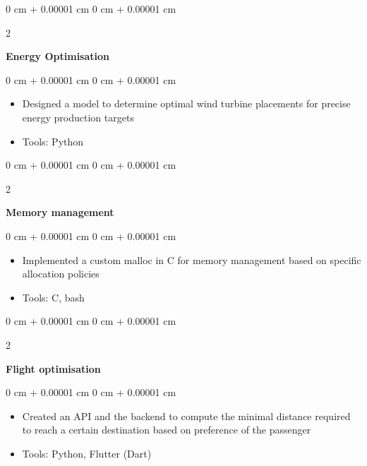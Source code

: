 \documentclass[10pt, letterpaper]{article}
\newenvironment{highlights}{
    \begin{itemize}[
        topsep=0.10 cm,
        parsep=0.10 cm,
        partopsep=0pt,
        itemsep=0pt,
        leftmargin=0 cm + 10pt
    ]
}{
    \end{itemize}
} %
\newenvironment{onecolentry}{
    \begin{adjustwidth}{
        0 cm + 0.00001 cm
    }{
        0 cm + 0.00001 cm
    }
}{
    \end{adjustwidth}
} %
\newenvironment{twocolentry}[2][]{
    \onecolentry
    \def\secondColumn{#2}
    \setcolumnwidth{\fill, 4.5 cm}
    \begin{paracol}{2}
}{
    \switchcolumn \raggedleft \secondColumn
    \end{paracol}
    \endonecolentry
} %
\begin{document}
        \vspace{0.2 cm}
    



        
        \begin{twocolentry}{
            
        }
            \textbf{Energy Optimisation}\end{twocolentry}

        \vspace{0.10 cm}
        \begin{onecolentry}
            \begin{highlights}
                \item Designed a model to determine optimal wind turbine placements for precise energy production targets
                \item Tools: Python
            \end{highlights}
        \end{onecolentry}


        \vspace{0.2 cm}

        \begin{twocolentry}{
            
        }
            \textbf{Memory management}\end{twocolentry}

        \vspace{0.10 cm}
        \begin{onecolentry}
            \begin{highlights}
                \item Implemented a custom malloc in C for memory management based on specific allocation policies
                \item Tools: C, bash
            \end{highlights}
        \end{onecolentry}



        \vspace{0.2 cm}
        \begin{twocolentry}{
            
        }
            \textbf{Flight optimisation}\end{twocolentry}
        \vspace{0.10 cm}
        \begin{onecolentry}
            \begin{highlights}
                \item Created an API and the backend to compute the minimal distance required to reach a certain destination based on preference of the passenger
                \item Tools: Python, Flutter (Dart)
            \end{highlights}
        \end{onecolentry}
        \vspace{0.2 cm}
        
\end{document}
